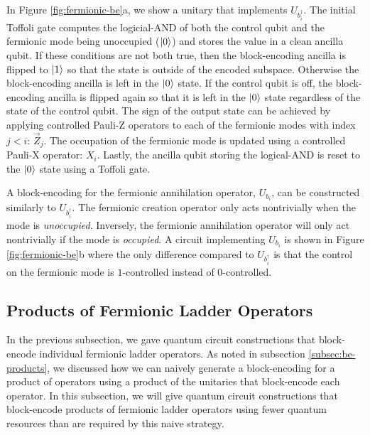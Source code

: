 In Figure \ref{fig:fermionic-be}a, we show a unitary that implements $U_{b^\dagger_i}$.
The initial Toffoli gate computes the logicial-AND of both the control qubit and the fermionic mode being unoccupied ($\ket{0}$) and stores the value in a clean ancilla qubit.
If these conditions are not both true, then the block-encoding ancilla is flipped to $\ket{1}$ so that the state is outside of the encoded subspace.
Otherwise the block-encoding ancilla is left in the $\ket{0}$ state.
If the control qubit is off, the block-encoding ancilla is flipped again so that it is left in the $\ket{0}$ state regardless of the state of the control qubit.
The sign of the output state can be achieved by applying controlled Pauli-Z operators to each of the fermionic modes with index $j < i$: $\vec{Z}_j$.
The occupation of the fermionic mode is updated using a controlled Pauli-X operator: $X_i$.
Lastly, the ancilla qubit storing the logical-AND is reset to the $\ket{0}$ state using a Toffoli gate.

A block-encoding for the fermionic annihilation operator, $U_{b_i}$, can be constructed similarly to $U_{b^\dagger_i}$.
The fermionic creation operator only acts nontrivially when the mode is \textit{unoccupied}.
Inversely, the fermionic annihilation operator will only act nontrivially if the mode is \textit{occupied}.
A circuit implementing $U_{b_i}$ is shown in Figure \ref{fig:fermionic-be}b where the only difference compared to $U_{b^\dagger_i}$ is that the control on the fermionic mode is $1$-controlled instead of $0$-controlled.

 

\subsection{Products of Fermionic Ladder Operators}

In the previous subsection, we gave quantum circuit constructions that block-encode individual fermionic ladder operators.
As noted in subsection \ref{subsec:be-products}, we discussed how we can naively generate a block-encoding for a product of operators using a product of the unitaries that block-encode each operator.
In this subsection, we will give quantum circuit constructions that block-encode products of fermionic ladder operators using fewer quantum resources than are required by this naive strategy.

